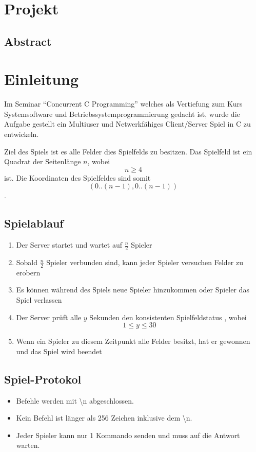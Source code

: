 \chapter{Projekt}

\section{Abstract}
\label{abstract}


\chapter{Einleitung}
Im Seminar ``Concurrent C Programming'' welches als Vertiefung zum Kurs Systemsoftware und Betriebssystemprogrammierung gedacht ist, wurde die Aufgabe gestellt ein Multiuser und Netwerkfähiges Client/Server Spiel in C zu entwickeln.

Ziel des Spiels ist es alle Felder dies Spielfelds zu besitzen. Das Spielfeld ist ein Quadrat der Seitenlänge $n$, wobei $$n \geq  4$$ ist. Die Koordinaten des Spielfeldes sind somit $$(0..(n-1), 0..(n-1))$$.

\section{Spielablauf}
\begin{enumerate}
	\item Der Server startet und wartet auf $\frac{n}{2}$ Spieler
	\item Sobald $\frac{n}{2}$ Spieler verbunden sind, kann jeder Spieler versuchen Felder zu erobern
	\item Es können während des Spiels neue Spieler hinzukommen oder Spieler das Spiel verlassen
	\item Der Server prüft alle $y$ Sekunden den konsistenten Spielfeldstatus , wobei $$1 \leq y \leq 30$$
	\item Wenn ein Spieler zu diesem Zeitpunkt alle Felder besitzt, hat er gewonnen und das Spiel wird beendet
\end{enumerate}

\section{Spiel-Protokol}
\begin{itemize}
	\item Befehle werden mit \textbackslash n abgeschlossen.
	\item Kein Befehl ist länger als 256 Zeichen inklusive dem \textbackslash n.
	\item Jeder Spieler kann nur 1 Kommando senden und muss auf die Antwort warten.
\end{itemize}

